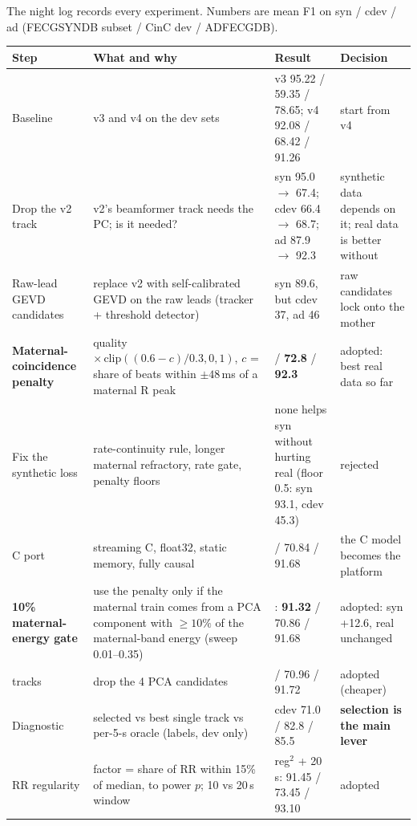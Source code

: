 \documentclass[11pt]{article}
\begin{document}
The night log records every experiment. Numbers are mean F1 on syn / cdev / ad (FECGSYNDB subset / CinC dev / ADFECGDB).

{\small

\begin{longtable}{@{}>{\raggedright\arraybackslash}p{2.9cm} >{\raggedright\arraybackslash}p{6.0cm} >{\raggedright\arraybackslash}p{3.7cm} >{\raggedright\arraybackslash}p{2.6cm}@{}}
\toprule
\textbf{Step} & \textbf{What and why} & \textbf{Result} & \textbf{Decision} \\
\midrule
\endhead
Baseline & v3 and v4 on the dev sets & v3 95.22 / 59.35 / 78.65; v4 92.08 / 68.42 / 91.26 & start from v4 \\
Drop the v2 track & v2's beamformer track needs the PC; is it needed? & syn 95.0 $\to$ 67.4; cdev 66.4 $\to$ 68.7; ad 87.9 $\to$ 92.3 & synthetic data depends on it; real data is better without \\
Raw-lead GEVD candidates & replace v2 with self-calibrated GEVD on the raw leads (tracker + threshold detector) & syn 89.6, but cdev 37, ad 46 & raw candidates lock onto the mother \\
\textbf{Maternal-coincidence penalty} & quality $\times\,\text{clip}((0.6-c)/0.3, 0, 1)$, $c$ = share of beats within $\pm48$\,ms of a maternal R peak & 78.8 / \textbf{72.8} / \textbf{92.3} & adopted: best real data so far \\
Fix the synthetic loss & rate-continuity rule, longer maternal refractory, rate gate, penalty floors & none helps syn without hurting real (floor 0.5: syn 93.1, cdev 45.3) & rejected \\
C port & streaming C, float32, static memory, fully causal & 78.73 / 70.84 / 91.68 & the C model becomes the platform \\
\textbf{10\% maternal-energy gate} & use the penalty only if the maternal train comes from a PCA component with $\ge 10\%$ of the maternal-band energy (sweep 0.01--0.35) & 0.1: \textbf{91.32} / 70.86 / 91.68 & adopted: syn +12.6, real unchanged \\
16 tracks & drop the 4 PCA candidates & 91.32 / 70.96 / 91.72 & adopted (cheaper) \\
Diagnostic & selected vs best single track vs per-5-s oracle (labels, dev only) & cdev 71.0 / 82.8 / 85.5 & \textbf{selection is the main lever} \\
RR regularity & factor = share of RR within 15\% of median, to power $p$; 10 vs 20\,s window & reg$^2$ + 20\,s: 91.45 / 73.45 / 93.10 & adopted \\

\end{longtable}}
\end{document}
